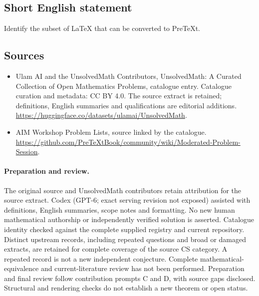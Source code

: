 \documentclass[11pt]{article}
\begin{document}
\subsection{Short English statement}
Identify the subset of LaTeX that can be converted to PreTeXt.
\subsection{Sources}
\begin{itemize}
\item[\hypertarget{source:statement:1}{S1}] Ulam AI and the UnsolvedMath Contributors, UnsolvedMath: A Curated Collection of Open Mathematics Problems, catalogue entry. Catalogue curation and metadata: CC BY 4.0. The source extract is retained; definitions, English summaries and qualifications are editorial additions.
\url{https://huggingface.co/datasets/ulamai/UnsolvedMath}.
\item[\hypertarget{source:statement:2}{S2}] AIM Workshop Problem Lists, source linked by the catalogue.
\url{https://github.com/PreTeXtBook/community/wiki/Moderated-Problem-Session}.
\end{itemize}
\paragraph{Preparation and review.}
The original source and UnsolvedMath contributors retain attribution for the source extract. Codex (GPT-6; exact serving revision not exposed) assisted with definitions, English summaries, scope notes and formatting. No new human mathematical authorship or independently verified solution is asserted. Catalogue identity checked against the complete supplied registry and current repository. Distinct upstream records, including repeated questions and broad or damaged extracts, are retained for complete coverage of the source CS category. A repeated record is not a new independent conjecture. Complete mathematical-equivalence and current-literature review has not been performed. Preparation and final review follow contribution prompts C and D, with source gaps disclosed. Structural and rendering checks do not establish a new theorem or open status.
\label{end:statement}
\end{document}
